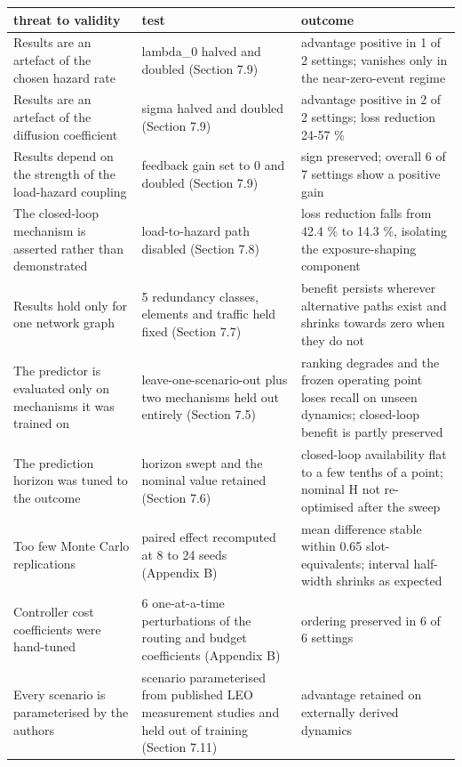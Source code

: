 \begin{tabular}{lll}
\toprule
threat to validity & test & outcome \\
\midrule
Results are an artefact of the chosen hazard rate & lambda\_0 halved and doubled (Section 7.9) & advantage positive in 1 of 2 settings; vanishes only in the near-zero-event regime \\
Results are an artefact of the diffusion coefficient & sigma halved and doubled (Section 7.9) & advantage positive in 2 of 2 settings; loss reduction 24-57 \% \\
Results depend on the strength of the load-hazard coupling & feedback gain set to 0 and doubled (Section 7.9) & sign preserved; overall 6 of 7 settings show a positive gain \\
The closed-loop mechanism is asserted rather than demonstrated & load-to-hazard path disabled (Section 7.8) & loss reduction falls from 42.4 \% to 14.3 \%, isolating the exposure-shaping component \\
Results hold only for one network graph & 5 redundancy classes, elements and traffic held fixed (Section 7.7) & benefit persists wherever alternative paths exist and shrinks towards zero when they do not \\
The predictor is evaluated only on mechanisms it was trained on & leave-one-scenario-out plus two mechanisms held out entirely (Section 7.5) & ranking degrades and the frozen operating point loses recall on unseen dynamics; closed-loop benefit is partly preserved \\
The prediction horizon was tuned to the outcome & horizon swept and the nominal value retained (Section 7.6) & closed-loop availability flat to a few tenths of a point; nominal H not re-optimised after the sweep \\
Too few Monte Carlo replications & paired effect recomputed at 8 to 24 seeds (Appendix B) & mean difference stable within 0.65 slot-equivalents; interval half-width shrinks as expected \\
Controller cost coefficients were hand-tuned & 6 one-at-a-time perturbations of the routing and budget coefficients (Appendix B) & ordering preserved in 6 of 6 settings \\
Every scenario is parameterised by the authors & scenario parameterised from published LEO measurement studies and held out of training (Section 7.11) & advantage retained on externally derived dynamics \\
\bottomrule
\end{tabular}
